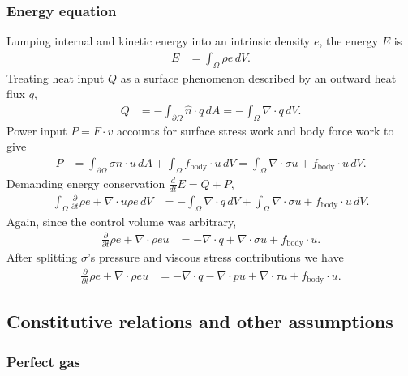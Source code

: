 \documentclass[letterpaper,11pt,nointlimits]{amsart}
\begin{document}
\subsubsection{Energy equation} 
Lumping internal and kinetic energy into an intrinsic density $e$, 
the energy $E$ is
\begin{align}
  E &= \int_{\Omega} \rho{}e \, dV 
  .
\end{align}
Treating heat input $Q$ as a surface phenomenon described by an outward
heat flux $q$, 
\begin{align}
  Q 
  &= 
  -\int_{\partial\Omega}\hat{n}\cdot{}q\,dA
  =
  -\int_{\Omega}\nabla\cdot{}q\,dV
  .
\end{align}
Power input $P=F\cdot{}v$ accounts for surface stress work and body force work
to give
\begin{align}
  P 
  &= 
    \int_{\partial\Omega} \sigma{}\hat{n} \cdot{} u \, dA 
  + \int_{\Omega} f_\text{body} \cdot{} u \, dV 
  = \int_{\Omega} \nabla\cdot{}\sigma{}u + f_\text{body} \cdot{} u \, dV 
  .
\end{align}
Demanding energy conservation $\frac{d}{dt}E=Q+P$,
\begin{align}
  \int_{\Omega}\frac{\partial}{\partial{}t} \rho{}e
  +
  \nabla\cdot{}u\rho{}e
  \,dV
&=
  - \int_{\Omega}\nabla\cdot{}q\,dV
  + \int_{\Omega} \nabla\cdot\sigma{}u + f_\text{body} \cdot{} u \, dV 
  .
\end{align}
Again, since the control volume was arbitrary, 
\begin{align}
  \frac{\partial}{\partial{}t} \rho{}e
  +
  \nabla\cdot{}\rho{}eu
&=
  - \nabla\cdot{}q + \nabla\cdot\sigma{}u + f_\text{body} \cdot{} u 
  .
\end{align}
After splitting $\sigma$'s pressure and viscous stress contributions we have
\begin{align}
  \label{eq:cons_energy}
  \frac{\partial}{\partial{}t} \rho{}e
  +
  \nabla\cdot{}\rho{}eu
&=
  - \nabla\cdot{}q 
  - \nabla\cdot{}pu
  + \nabla\cdot{}\tau{}u
  + f_\text{body} \cdot{} u 
  .
\end{align}

\subsection{Constitutive relations and other assumptions}

\subsubsection{Perfect gas}
\end{document}
